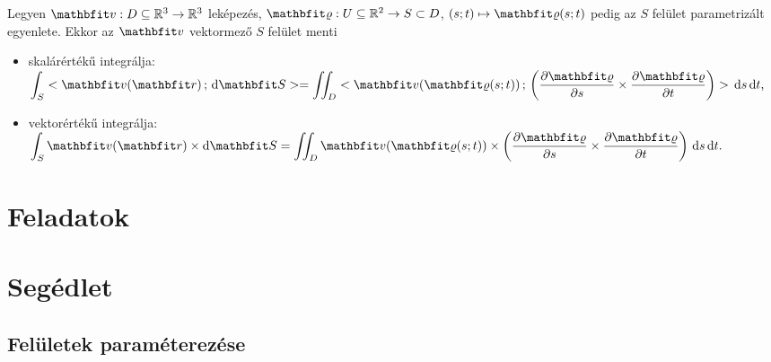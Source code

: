\documentclass[lang=magyar]{math-handout}
\begin{document}
\vfill

\begin{definition}
  Legyen $\rvec v: D \subseteq \mathbb R^3 \rightarrow \mathbb R^3$ leképezés,
  $\rvec \varrho: U \subseteq \mathbb R^2 \rightarrow S \subset D$, $(s;t)
    \mapsto \rvec \varrho(s;t)$ pedig az $S$ felület parametrizált egyenlete.
  Ekkor az $\rvec v$ vektormező $S$ felület menti
  \begin{itemize}
    \item skalárértékű integrálja:
          \(
            \displaystyle
            \int_S \scalar{\rvec v (\rvec r)}{\diff \rvec S} =
            \iint_D \scalar
            {\rvec v (\rvec \varrho(s; t))}
            {\left(\pdv{\rvec \varrho}{s} \times \pdv{\rvec \varrho}{t}\right)}
            \, \diff s \, \diff t
            \text,
          \)
    \item vektorértékű integrálja:
          \(
            \displaystyle
            \int_S \rvec v (\rvec r) \times \diff \rvec S =
            \iint_D {\rvec v (\rvec \varrho(s; t))} \times
            \left(\pdv{\rvec \varrho}{s} \times \pdv{\rvec \varrho}{t}\right)
            \, \diff s \, \diff t
            \text.
          \)

  \end{itemize}
\end{definition}

\clearpage
\section{Feladatok}

\clearpage
\section{Segédlet}

\subsection{Felületek paraméterezése}
\end{document}
